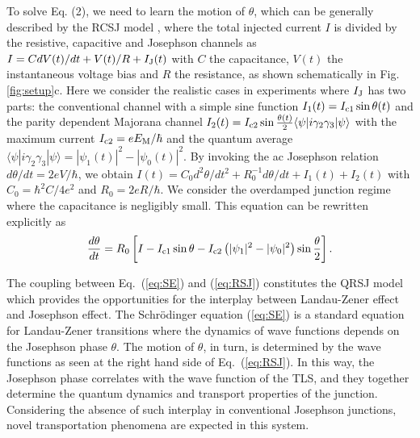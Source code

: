 \documentclass[aps,prl,twocolumn,showpacs,showpacs,10pt,superscriptaddress]{revtex4-1}
\begin{document}
To solve Eq. (2), we need to learn the motion of $\theta$, which can be generally described by the RCSJ model \cite{tinkhambook}, where the total injected current $I$ is divided by the resistive, capacitive and Josephson channels as $I= C {dV(t)}/{dt} +{V(t)}/{ R } + I_{\rm J}(t)$ with $C$ the capacitance, $V(t)$ the instantaneous voltage bias and $R$ the resistance, as shown schematically in Fig. \ref{fig:setup}c. Here we consider the realistic cases in experiments where $I_{\rm J}$ has two parts: the conventional channel with a simple sine function $I_1(t) = I_{\rm c1}\sin{\theta(t)}$ and the parity dependent Majorana channel $I_2(t)  =  I_{\rm c2}\sin{\frac{\theta(t)}{2}}\langle \psi| i\gamma_2\gamma_3 |\psi\rangle$ with the maximum current $I_{\rm c2}={eE_{\rm M}}/{\hbar}$ and the quantum average $\langle \psi | i \gamma_2\gamma_3 |\psi\rangle = |\psi_1(t)|^2 - |\psi_0(t)|^2$. By invoking the ac Josephson relation $ d \theta/dt = 2eV/\hbar$, we obtain $I(t) = C_0{d^2\theta}/{dt^2} + R_0^{-1}{d\theta}/{dt} + I_1(t) + I_2 (t)$ with $C_0 =  \hbar^2 C  /  4e^2$ and $R_0 = 2e R / \hbar$. We consider the overdamped junction regime where the capacitance is negligibly small. This equation can be rewritten explicitly as
\begin{equation}\label{eq:RSJ}
\frac{d\theta}{dt} = R_0 \left[I - I_{\rm c1}\sin{\theta} - I_{\rm c2}\left(|\psi_1|^2 - |\psi_0|^2\right)  \sin{\frac{\theta}{2}}\right].
\end{equation}


The coupling between Eq.~(\ref{eq:SE}) and (\ref{eq:RSJ}) constitutes the QRSJ model which provides the opportunities for the interplay between Landau-Zener effect and Josephson effect.
The Schr\"{o}dinger equation (\ref{eq:SE}) is a standard equation for Landau-Zener transitions where the dynamics of wave functions depends on the Josephson phase $\theta$. The motion of $\theta$, in turn, is determined by the wave functions as seen at the right hand side of Eq.~(\ref{eq:RSJ}). In this way, the Josephson phase correlates with the wave function of the TLS, and they together determine the quantum dynamics and transport properties of the junction. Considering the absence of such interplay in conventional Josephson junctions, novel transportation phenomena are expected in this system.
\end{document}

